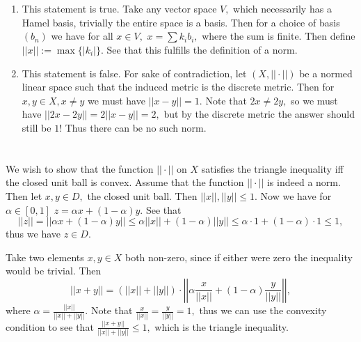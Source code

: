 \documentclass{article}
\title{} %
\author{Gandhar Kulkarni (mmat2304)} %
\date{} %
\begin{document}
\maketitle %


\section{} %
\begin{enumerate}
	\item This statement is true. Take any vector space $V,$ which necessarily has a Hamel basis, trivially the entire space is a basis. Then for a choice 
	of basis $(b_n)$ we have for all $x \in V,$ $x=\sum k_ib_i,$ where the sum is finite. Then define $||x||:= \max \{|k_i|\}.$ See that this fulfills the 
	definition of a norm. 
	\item This statement is false. For sake of contradiction, let $(X,||\cdot||)$ be a normed linear space such that the induced metric is the discrete 
	metric. Then for $x,y \in X, x \neq y$ we must have $||x-y|| =1.$ Note that $2x\neq 2y,$ so we must have $||2x-2y||=2||x-y||=2,$ but by the discrete 
	metric the answer should still be $1!$ Thus there can be no such norm.
\end{enumerate}
\section{} %
We wish to show that the function $||\cdot|| $ on $X$ satisfies the triangle inequality iff the closed unit ball is convex.
Assume that the function $||\cdot||$ is indeed a norm. Then let $x,y \in D,$ the closed unit ball. Then $||x||,||y|| \leq 1.$ Now we have for $\alpha \in 
[0,1]$ $z=\alpha x+(1-\alpha)y.$ See that $$||z|| =||\alpha x+(1-\alpha)y|| \leq \alpha ||x|| + (1-\alpha) ||y|| \leq \alpha \cdot 1 + (1-\alpha) \cdot 1 
\leq 1,$$ thus we have $z \in D.$

Take two elements $x,y \in X$ both non-zero, since if either were zero the inequality would be trivial. Then $$||x+y|| = (||x||+||y||)\cdot 
\left|\left|\alpha \frac{x}{||x||}+ (1-\alpha)\frac{y}{||y||}\right|\right|,$$ where $\alpha=\frac{||x||}{||x||+||y||}.$ Note that 
$\frac{x}{||x||}=\frac{y}{||y||}=1,$ thus we can use the convexity condition to see that $\frac{||x+y||}{||x||+||y||} \leq 1,$ which is the triangle 
inequality.
\end{document}
